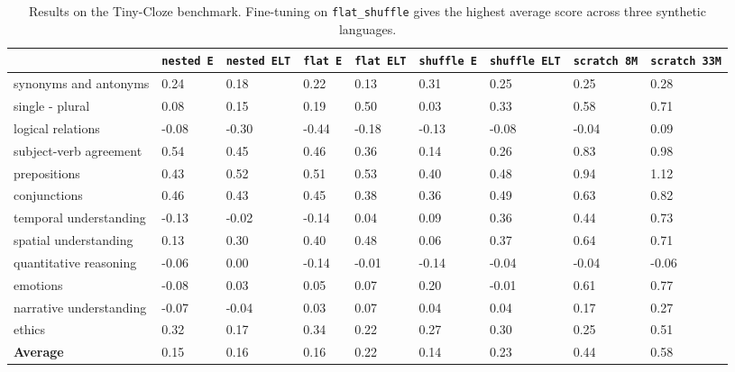 
\begin{table}[ht]
\centering
\begin{tabular}{|p{70pt}|*{8}{p{27pt}|}}
\hline & \texttt{\scriptsize{nested E}} & \texttt{\scriptsize{nested ELT}} & \texttt{\scriptsize{flat E}} & \texttt{\scriptsize{flat ELT}} & \texttt{\scriptsize{shuffle E}} & \texttt{\scriptsize{shuffle ELT}} & \texttt{\scriptsize{scratch 8M}} & \texttt{\scriptsize{scratch 33M}}\\
\hline
    \scriptsize{synonyms and antonyms} & 0.24 & 0.18 & 0.22 & 0.13 & 0.31 & 0.25 & 0.25 & 0.28 \\ \hline
    \scriptsize{single - plural} & 0.08 & 0.15 & 0.19 & 0.50 & 0.03 & 0.33 & 0.58 & 0.71 \\ \hline
    \scriptsize{logical relations} & -0.08 & -0.30 & -0.44 & -0.18 & -0.13 & -0.08 & -0.04 & 0.09 \\ \hline
    \scriptsize{subject-verb agreement} & 0.54 & 0.45 & 0.46 & 0.36 & 0.14 & 0.26 & 0.83 & 0.98 \\ \hline
    \scriptsize{prepositions} & 0.43 & 0.52 & 0.51 & 0.53 & 0.40 & 0.48 & 0.94 & 1.12 \\ \hline
    \scriptsize{conjunctions} & 0.46 & 0.43 & 0.45 & 0.38 & 0.36 & 0.49 & 0.63 & 0.82 \\ \hline
    \scriptsize{temporal understanding} & -0.13 & -0.02 & -0.14 & 0.04 & 0.09 & 0.36 & 0.44 & 0.73 \\ \hline
    \scriptsize{spatial understanding} & 0.13 & 0.30 & 0.40 & 0.48 & 0.06 & 0.37 & 0.64 & 0.71 \\ \hline
    \scriptsize{quantitative reasoning} & -0.06 & 0.00 & -0.14 & -0.01 & -0.14 & -0.04 & -0.04 & -0.06 \\ \hline
    \scriptsize{emotions} & -0.08 & 0.03 & 0.05 & 0.07 & 0.20 & -0.01 & 0.61 & 0.77 \\ \hline
    \scriptsize{narrative understanding} & -0.07 & -0.04 & 0.03 & 0.07 & 0.04 & 0.04 & 0.17 & 0.27 \\ \hline
    \scriptsize{ethics} & 0.32 & 0.17 & 0.34 & 0.22 & 0.27 & 0.30 & 0.25 & 0.51 \\ \hline
\hline\scriptsize{{\textbf{{Average}}}} & 0.15 & 0.16 & 0.16 & 0.22 & 0.14 & 0.23 & 0.44 & 0.58 \\
\hline
\end{tabular}
\caption{Results on the Tiny-Cloze benchmark. Fine-tuning on \texttt{flat\_shuffle} gives the highest average score across three synthetic languages.}
\label{tab:cloze}
\end{table}
